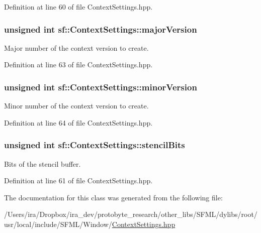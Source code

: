 Definition at line 60 of file Context\-Settings.\-hpp.

\hypertarget{structsf_1_1_context_settings_a99a680d5c15a7e34c935654155dd5166}{
\subsubsection[{major\-Version}]{\setlength{\rightskip}{0pt plus 5cm}unsigned int sf\-::\-Context\-Settings\-::major\-Version}}\label{structsf_1_1_context_settings_a99a680d5c15a7e34c935654155dd5166}


Major number of the context version to create. 



Definition at line 63 of file Context\-Settings.\-hpp.

\hypertarget{structsf_1_1_context_settings_aaeb0efe9d2658b840da93b30554b100f}{
\subsubsection[{minor\-Version}]{\setlength{\rightskip}{0pt plus 5cm}unsigned int sf\-::\-Context\-Settings\-::minor\-Version}}\label{structsf_1_1_context_settings_aaeb0efe9d2658b840da93b30554b100f}


Minor number of the context version to create. 



Definition at line 64 of file Context\-Settings.\-hpp.

\hypertarget{structsf_1_1_context_settings_ac2e788c201ca20e84fd38a28071abd29}{
\subsubsection[{stencil\-Bits}]{\setlength{\rightskip}{0pt plus 5cm}unsigned int sf\-::\-Context\-Settings\-::stencil\-Bits}}\label{structsf_1_1_context_settings_ac2e788c201ca20e84fd38a28071abd29}


Bits of the stencil buffer. 



Definition at line 61 of file Context\-Settings.\-hpp.



The documentation for this class was generated from the following file\-:\begin{DoxyCompactItemize}
\item 
/\-Users/ira/\-Dropbox/ira\-\_\-dev/protobyte\-\_\-research/other\-\_\-libs/\-S\-F\-M\-L/dylibs/root/usr/local/include/\-S\-F\-M\-L/\-Window/\hyperlink{_context_settings_8hpp}{Context\-Settings.\-hpp}\end{DoxyCompactItemize}
